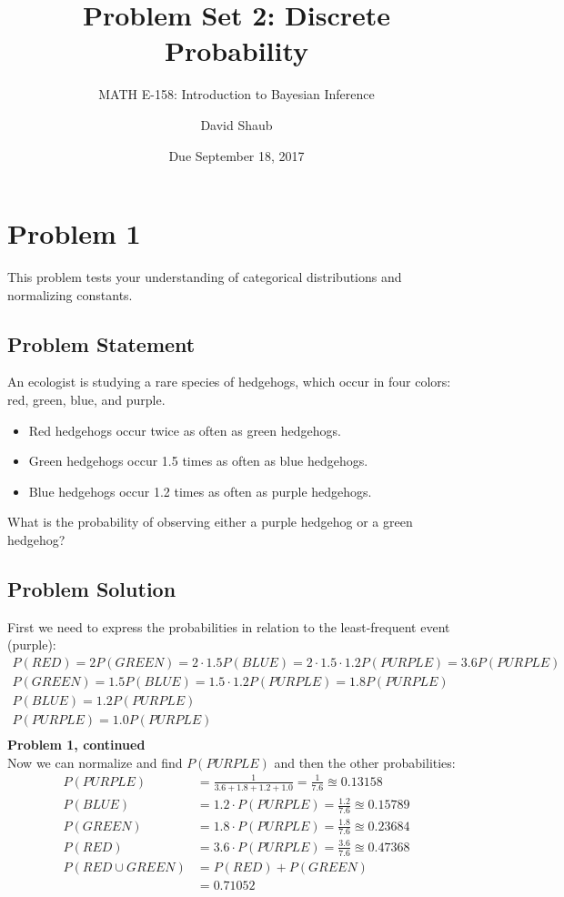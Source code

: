 \documentclass[12pt]{article}
\title{Problem Set 2: Discrete Probability}
\author{MATH E-158: Introduction to Bayesian Inference}
\author{David Shaub}
\date{Due September 18, 2017}
\theoremstyle{definition}
\begin{document}
\maketitle





\section*{Problem 1}

This problem tests your understanding of categorical distributions and normalizing constants.

\subsection*{Problem Statement}

An ecologist is studying a rare species of hedgehogs, which occur in four colors: red, green, blue, and purple.
\begin{itemize}
	\item Red hedgehogs occur twice as often as green hedgehogs.
	\item Green hedgehogs occur 1.5 times as often as blue hedgehogs.
	\item Blue hedgehogs occur 1.2 times as often as purple hedgehogs.
\end{itemize}
What is the probability of observing either a purple hedgehog or a green hedgehog?

\subsection*{Problem Solution}
First we need to express the probabilities in relation to the least-frequent event (purple):
\begin{align*}
P(RED) = 2P(GREEN)=2 \cdot 1.5P(BLUE) = 2 \cdot 1.5 \cdot 1.2P(PURPLE) = 3.6P(PURPLE)\\
P(GREEN) = 1.5P(BLUE) = 1.5 \cdot 1.2P(PURPLE) = 1.8P(PURPLE)\\
P(BLUE) = 1.2P(PURPLE)\\
P(PURPLE) = 1.0P(PURPLE)\\
\end{align*}
\newpage
\noindent
{\bf Problem 1, continued}\\
Now we can normalize and find $P(PURPLE)$ and then the other probabilities:
\begin{align*}
P(PURPLE) &= \frac{1}{3.6 + 1.8 + 1.2 + 1.0} = \frac{1}{7.6} \approxeq 0.13158\\
P(BLUE) &= 1.2 \cdot P(PURPLE) = \frac{1.2}{7.6} \approxeq 0.15789\\
P(GREEN) &= 1.8 \cdot P(PURPLE) = \frac{1.8}{7.6} \approxeq 0.23684\\
P(RED) &= 3.6 \cdot P(PURPLE) = \frac{3.6}{7.6} \approxeq 0.47368\\
P(RED \cup GREEN) &= P(RED) + P(GREEN)\\
&= 0.71052
\end{align*}
\end{document}
